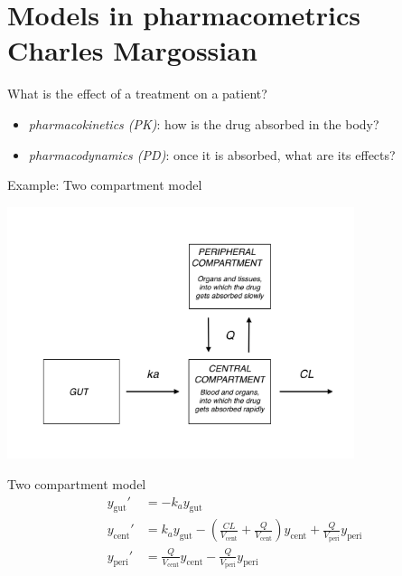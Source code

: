 \documentclass[presentation]{beamer}
\begin{document}
\section{Models in pharmacometrics \\ \small{Charles Margossian}}
\label{sec:orgd4b0b39}
\begin{frame}[label={sec:org76e70f5}]{What is the effect of a treatment on a patient?}
\begin{itemize}
\item \emph{pharmacokinetics (PK)}: how is the drug absorbed in the body?
\item \emph{pharmacodynamics (PD)}: once it is absorbed, what are its effects?
\end{itemize}
\end{frame}

\begin{frame}[label={sec:org3f746e3}]{Example: Two compartment model}
\begin{latex}
\begin{center}
  \includegraphics[width=4in]{TwoCptNice.png}
\end{center}
\end{latex}
\end{frame}

\begin{frame}[label={sec:org50cfb55}]{Two compartment model}
\begin{align*}
   y_\mathrm{gut}' &= -k_a y_\mathrm{gut} \\
   y_\mathrm{cent}' &= k_a y_\mathrm{gut} - \left(\frac{CL}{V_\mathrm{cent}} + \frac{Q}{V_\mathrm{cent}} \right) y_\mathrm{cent} +  \frac{Q}{V_\mathrm{peri}} y_\mathrm{peri} \\
   y_\mathrm{peri}' &= \frac{Q}{V_\mathrm{cent}} y_\mathrm{cent} - \frac{Q}{V_\mathrm{peri}} y_\mathrm{peri}
   \label{eq:2Cpt}
\end{align*}
\end{frame}
\end{document}
